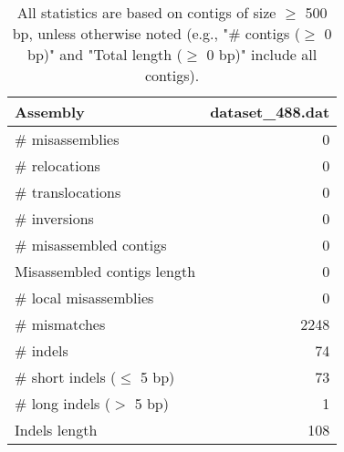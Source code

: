 \documentclass[12pt,a4paper]{article}
\begin{document}
\begin{table}[ht]
\begin{center}
\caption{All statistics are based on contigs of size $\geq$ 500 bp, unless otherwise noted (e.g., "\# contigs ($\geq$ 0 bp)" and "Total length ($\geq$ 0 bp)" include all contigs).}
\begin{tabular}{|l*{1}{|r}|}
\hline
Assembly & dataset\_488.dat \\ \hline
\# misassemblies & 0 \\ \hline
\hspace{5mm}\# relocations & 0 \\ \hline
\hspace{5mm}\# translocations & 0 \\ \hline
\hspace{5mm}\# inversions & 0 \\ \hline
\# misassembled contigs & 0 \\ \hline
Misassembled contigs length & 0 \\ \hline
\# local misassemblies & 0 \\ \hline
\# mismatches & 2248 \\ \hline
\# indels & 74 \\ \hline
\hspace{5mm}\# short indels ($\leq$ 5 bp) & 73 \\ \hline
\hspace{5mm}\# long indels ($>$ 5 bp) & 1 \\ \hline
Indels length & 108 \\ \hline
\end{tabular}
\end{center}
\end{table}
\end{document}
